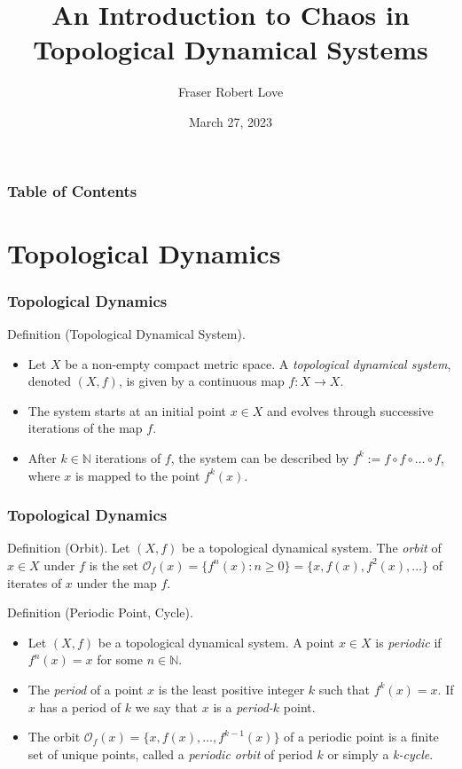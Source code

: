 \documentclass{beamer}
\title{An Introduction to Chaos in Topological Dynamical Systems}
\author{Fraser Robert Love}
\institute{School of Mathematics and Statistics \\ University of St Andrews}
\date{March 27, 2023}
\begin{document}
\frame{\titlepage}

\begin{frame}
    \frametitle{Table of Contents}
    \tableofcontents
\end{frame}

\section{Topological Dynamics}
\begin{frame}
    \frametitle{Topological Dynamics}

    \begin{block}{Definition (Topological Dynamical System).}
        \begin{itemize}
            \item Let $X$ be a non-empty compact metric space. A \emph{topological dynamical system}, denoted $(X, f)$, is given by a continuous map $f: X \to X$. 
            \item The system starts at an initial point $x \in X$ and evolves through successive iterations of the map $f$.
            \item After $k \in \mathbb{N}$ iterations of $f$, the system can be described by $f^k := f \circ f \circ \dots \circ f$, where $x$ is mapped to the point $f^k(x)$.
        \end{itemize}
    \end{block}
\end{frame}

\begin{frame}
    \frametitle{Topological Dynamics}

    \begin{block}{Definition (Orbit).}
        Let $(X, f)$ be a topological dynamical system. The \emph{orbit} of $x \in X$ under $f$ is the set $\mathcal{O}_f(x) = \lbrace f^n(x) : n \geq 0 \rbrace = \lbrace x, f(x), f^2(x), \dots \rbrace$ of iterates of $x$ under the map $f$.
    \end{block}

    \begin{block}{Definition (Periodic Point, Cycle).}
        \begin{itemize}
            \item Let $(X, f)$ be a topological dynamical system. A point $x \in X$ is \emph{periodic} if $f^n(x) = x$ for some $n \in \mathbb{N}$.
            \item The \emph{period} of a point $x$ is the least positive integer $k$ such that $f^k(x) = x$. If $x$ has a period of $k$ we say that $x$ is a \emph{period-$k$} point.
            \item The orbit $\mathcal{O}_f(x) = \lbrace x, f(x), \dots, f^{k-1}(x) \rbrace$ of a periodic point is a finite set of unique points, called a \emph{periodic orbit} of period $k$ or simply a \emph{k-cycle}.
        \end{itemize}
    \end{block}
\end{frame}
\end{document}
